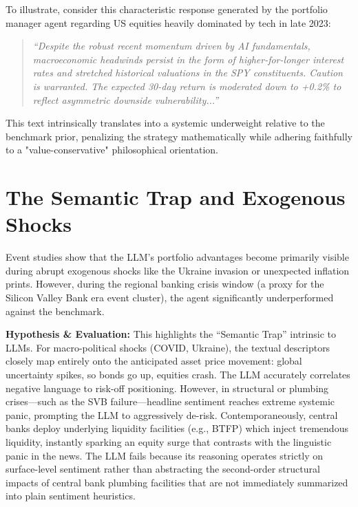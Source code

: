\documentclass[12pt]{report}
\begin{document}
To illustrate, consider this characteristic response generated by the portfolio manager agent regarding US equities heavily dominated by tech in late 2023:
\begin{quote}
    \textit{``Despite the robust recent momentum driven by AI fundamentals, macroeconomic headwinds persist in the form of higher-for-longer interest rates and stretched historical valuations in the SPY constituents. Caution is warranted. The expected 30-day return is moderated down to +0.2\% to reflect asymmetric downside vulnerability...''}
\end{quote}
This text intrinsically translates into a systemic underweight relative to the benchmark prior, penalizing the strategy mathematically while adhering faithfully to a "value-conservative" philosophical orientation.

\section{The Semantic Trap and Exogenous Shocks}
Event studies show that the LLM's portfolio advantages become primarily visible during abrupt exogenous shocks like the Ukraine invasion or unexpected inflation prints.
However, during the regional banking crisis window (a proxy for the Silicon Valley Bank era event cluster), the agent significantly underperformed against the benchmark.

\textbf{Hypothesis \& Evaluation:} This highlights the ``Semantic Trap'' intrinsic to LLMs. For macro-political shocks (COVID, Ukraine), the textual descriptors closely map entirely onto the anticipated asset price movement: global uncertainty spikes, so bonds go up, equities crash. The LLM accurately correlates negative language to risk-off positioning.
However, in structural or plumbing crises---such as the SVB failure---headline sentiment reaches extreme systemic panic, prompting the LLM to aggressively de-risk. Contemporaneously, central banks deploy underlying liquidity facilities (e.g., BTFP) which inject tremendous liquidity, instantly sparking an equity surge that contrasts with the linguistic panic in the news. The LLM fails because its reasoning operates strictly on surface-level sentiment rather than abstracting the second-order structural impacts of central bank plumbing facilities that are not immediately summarized into plain sentiment heuristics.
\end{document}
